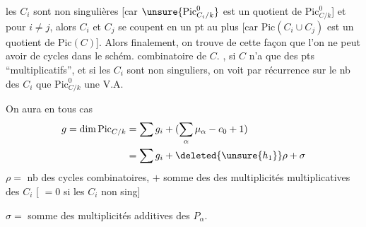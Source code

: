  les $C_i$ sont non singulières
[car $\unsure{\mathrm{Pic}_{C_i/k}^0}$ est un quotient de $\mathrm{Pic}_{C/k}^0$] et 
pour $i\ne j$, alors $C_i$ et $C_j$ se coupent en un pt au plus
[car $\mathrm{Pic}(C_i\cup C_j)$ est un quotient de $\mathrm{Pic}(C)$].
Alors finalement, on trouve de cette façon que l'on ne peut avoir de cycles
dans le schém. combinatoire de $C$. 
, si $C$ n'a que des pts 
``multiplicatifs'', et si les $C_i$ sont non singuliers, on voit par récurrence sur le nb des $C_i$ que
 $\mathrm{Pic}_{C/k}^0$  une V.A.

On aura en tous cas
\[
\begin{aligned}
g=\dim\mathrm{Pic}_{C/k}&=\sum g_i+(\sum_\alpha\mu_\alpha-c_0+1)\\
&=\sum g_i+\deleted{\unsure{h_1}}\rho+\sigma
\end{aligned}
\]
$\rho=$ nb des cycles combinatoires, $+$ somme des  des multiplicités multiplicatives des $C_i$
[ $=0$ si les $C_i$ non sing]

$\sigma=$ somme des multiplicités additives des $P_\alpha$.

